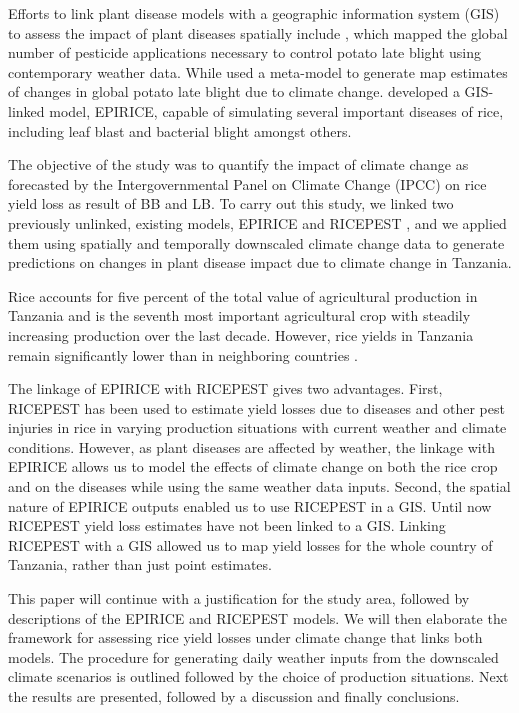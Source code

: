 \documentclass[preprint,12pt]{elsarticle}
\begin{document}
Efforts to link plant disease models with a geographic information system (GIS) to assess the impact of plant diseases spatially include  \citet{Hijmans2000}, which mapped the global number of pesticide applications necessary to control potato late blight using contemporary weather data. While \citet{Sparks2014} used a meta-model to generate map estimates of changes in global potato late blight due to climate change. \citet{Savary2012} developed a GIS-linked model, EPIRICE, capable of simulating several important diseases of rice, including leaf blast and bacterial blight amongst others.

The objective of the study was to quantify the impact of climate change as forecasted by the Intergovernmental Panel on Climate Change (IPCC) on rice yield loss as result of BB and LB. To carry out this study, we linked two previously unlinked, existing models, EPIRICE and RICEPEST \cite{Willocquet2000, Willocquet2002}, and we applied them using spatially and temporally downscaled climate change data to generate predictions on changes in plant disease impact due to climate change in Tanzania.

Rice accounts for five percent of the total value of agricultural production in Tanzania and is the seventh most important agricultural crop with steadily increasing production over the last decade. However, rice yields in Tanzania remain significantly lower than in neighboring countries \cite{Barreiro-Hurle2012}.

The linkage of EPIRICE with RICEPEST gives two advantages. First, RICEPEST has been used to estimate yield losses due to diseases and other pest injuries in rice in varying production situations with current weather and climate conditions. However, as plant diseases are affected by weather, the linkage with EPIRICE allows us to model the effects of climate change on both the rice crop and on the diseases while using the same weather data inputs. Second, the spatial nature of EPIRICE outputs enabled us to use RICEPEST in a GIS. Until now RICEPEST yield loss estimates have not been linked to a GIS. Linking RICEPEST with a GIS allowed us to map yield losses for the whole country of Tanzania, rather than just point estimates.

This paper will continue with a justification for the study area, followed by descriptions of the EPIRICE and RICEPEST models. We will then elaborate the framework for assessing rice yield losses under climate change that links both models. The procedure for generating daily weather inputs from the downscaled climate scenarios is outlined followed by the choice of production situations. Next the results are presented, followed by a discussion and finally conclusions.
\end{document}
